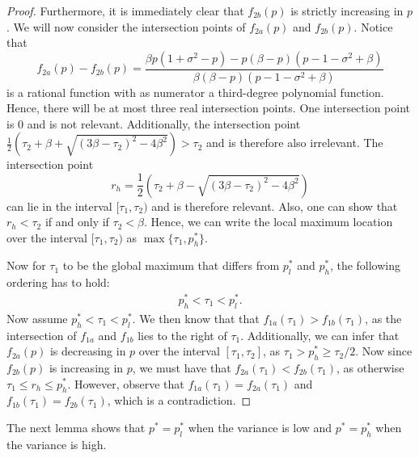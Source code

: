 \documentclass[11pt]{article}
\newcommand{\1}{\mathds{1}}
\begin{document}
\begin{proof}
Furthermore, it is immediately clear that $f_{2b}(p)$ is strictly increasing in $p$. We will now consider the intersection points of $f_{2a}(p)$ and $f_{2b}(p)$. Notice that $$f_{2a}(p) - f_{2b}(p) = \frac{\beta p(1+\sigma^2-p)-p(\beta-p)(p-1-\sigma^2+\beta)}{\beta(\beta-p)(p-1-\sigma^2+\beta)}$$ is a rational function with as numerator a third-degree polynomial function. Hence, there will be at most three real intersection points. One intersection point is 0 and is not relevant. Additionally, the intersection point $\frac{1}{2}\left(\tau_2+\beta+\sqrt{(3\beta-\tau_2)^2-4\beta^2}\right) > \tau_2$ and is therefore also irrelevant. The intersection point $$r_h = \frac{1}{2}\left(\tau_2+\beta-\sqrt{(3\beta-\tau_2)^2-4\beta^2}\right)$$ can lie in the interval $[\tau_1,\tau_2)$ and is therefore relevant. Also, one can show that $r_h < \tau_2$ if and only if $\tau_2 < \beta$. Hence, we can write the local maximum location over the interval $[\tau_1,\tau_2)$ as $\max\{\tau_1,p_{h}^*\}$.

Now for $\tau_1$ to be the global maximum that differs from $p^*_{l}$ and $p^*_{h}$, the following ordering has to hold:
\begin{align*}
    p^*_{h} < \tau_1 < p^*_{l}.
\end{align*}
Now assume $p^*_{h} < \tau_1 < p^*_{l}$. We then know that that $f_{1a}(\tau_1) > f_{1b}(\tau_1)$, as the intersection of $f_{1a}$ and $f_{1b}$ lies to the right of $\tau_1$. Additionally, we can infer that $f_{2a}(p)$ is decreasing in $p$ over the interval $[\tau_1,\tau_2]$, as $\tau_1 > p^*_h \geq \tau_2/2$. Now since $f_{2b}(p)$ is increasing in $p$, we must have that $f_{2a}(\tau_1)<f_{2b}(\tau_1)$, as otherwise $\tau_1 \leq r_h \leq p^*_h$. However, observe that $f_{1a}(\tau_1) = f_{2a}(\tau_1)$ and $f_{1b}(\tau_1) = f_{2b}(\tau_1)$, which is a contradiction.
\end{proof}

The next lemma shows that $p^* = p^*_l$ when the variance is low and $p^* = p^*_h$ when the variance is high.
\end{document}
